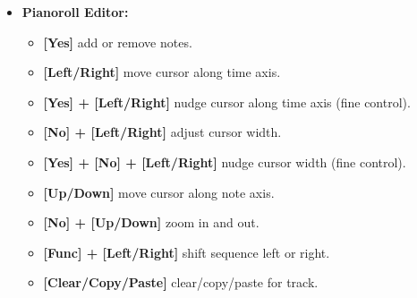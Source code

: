 \begin{itemize}
\item \textbf{Pianoroll Editor:}
\begin{itemize}
     \item \textbf{[Yes]} add or remove notes.
     \item \textbf{[Left/Right]} move cursor along time axis.
     \item \textbf{[Yes] + [Left/Right]} nudge cursor along time axis (fine control).
     \item \textbf{[No] + [Left/Right]} adjust cursor width.
     \item \textbf{[Yes] + [No] + [Left/Right]} nudge cursor width (fine control).
     \item \textbf{[Up/Down]} move cursor along note axis.
     \item \textbf{[No] + [Up/Down]} zoom in and out.
     \item \textbf{[Func] + [Left/Right]} shift sequence left or right.
     \item \textbf{[Clear/Copy/Paste]} clear/copy/paste for track.
\end{itemize}


\end{itemize}



